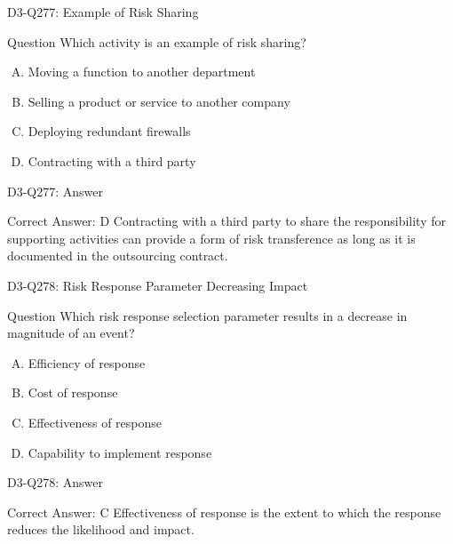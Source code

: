 \documentclass{beamer}
\begin{document}
	\begin{frame}{D3-Q277: Example of Risk Sharing}
		\begin{block}{Question}
			Which activity is an example of risk sharing?
		\end{block}
		\begin{enumerate}[(A)]
			\item Moving a function to another department
			\item Selling a product or service to another company
			\item Deploying redundant firewalls
			\item Contracting with a third party
		\end{enumerate}
	\end{frame}
	\begin{frame}{D3-Q277: Answer}
		\begin{block}{Correct Answer: D}
			Contracting with a third party to share the responsibility for supporting activities can provide a form of risk transference as long as it is documented in the outsourcing contract.
		\end{block}
	\end{frame}
	
	\begin{frame}{D3-Q278: Risk Response Parameter Decreasing Impact}
		\begin{block}{Question}
			Which risk response selection parameter results in a decrease in magnitude of an event?
		\end{block}
		\begin{enumerate}[(A)]
			\item Efficiency of response
			\item Cost of response
			\item Effectiveness of response
			\item Capability to implement response
		\end{enumerate}
	\end{frame}
	\begin{frame}{D3-Q278: Answer}
		\begin{block}{Correct Answer: C}
			Effectiveness of response is the extent to which the response reduces the likelihood and impact.
		\end{block}
	\end{frame}
	
\end{document}
